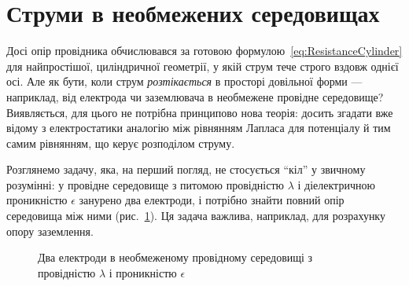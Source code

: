 
\section{Струми в необмежених середовищах}\label{sec:CurrentsInUnboundedMedia}\hypertarget{currents-in-unbounded-media}{}

Досі опір провідника обчислювався за готовою формулою~\eqref{eq:ResistanceCylinder} для найпростішої, циліндричної геометрії, у якій струм тече
строго вздовж однієї осі. Але як бути, коли струм \emph{розтікається} в просторі довільної форми --- наприклад, від електрода чи заземлювача в
необмежене провідне середовище? Виявляється, для цього не потрібна принципово нова теорія: досить згадати вже відому з електростатики аналогію між
рівнянням Лапласа для потенціалу й тим самим рівнянням, що керує розподілом струму.

Розглянемо задачу, яка, на перший погляд, не стосується \enquote{кіл} у звичному розумінні: у провідне середовище з питомою провідністю $\lambda$ і
діелектричною проникністю $\epsilon$ занурено два електроди, і потрібно знайти повний опір середовища між ними (рис.~\ref{pic:MediaCurrent}). Ця
задача важлива, наприклад, для розрахунку опору заземлення.

\begin{figure}[h!]\centering
	\caption{Два електроди в необмеженому провідному середовищі з провідністю $\lambda$ і
		проникністю $\epsilon$\label{pic:MediaCurrent}}
\end{figure}

